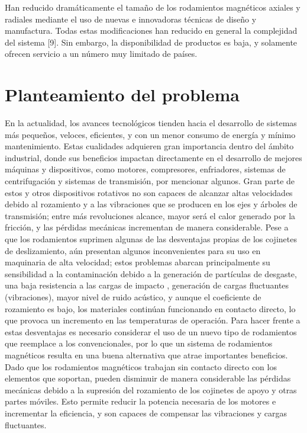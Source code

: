 Han reducido dramáticamente el tamaño de los rodamientos magnéticos axiales y radiales mediante el uso de nuevas e innovadoras técnicas de diseño y manufactura. Todas estas modificaciones han reducido en general la complejidad del sistema [9].
Sin embargo, la disponibilidad de productos es baja, y solamente ofrecen servicio a un número muy limitado de países.

\section*{Planteamiento del problema}
\label{sec:intro:results}

En la actualidad, los avances tecnológicos tienden hacia el desarrollo de sistemas más pequeños, veloces, eficientes, y con un menor consumo de energía y mínimo mantenimiento. Estas cualidades adquieren gran importancia dentro del ámbito industrial, donde sus beneficios impactan directamente en el desarrollo de mejores máquinas y dispositivos, como motores, compresores, enfriadores, sistemas de centrifugación y sistemas de transmisión, por mencionar algunos.
Gran parte de estos y otros dispositivos rotativos no son capaces de alcanzar altas velocidades debido al rozamiento y a las vibraciones que se producen en los ejes y árboles de transmisión; entre más revoluciones alcance, mayor será el calor generado por la fricción, y las pérdidas mecánicas incrementan de manera considerable. 
Pese a que los rodamientos suprimen algunas de las desventajas propias de los cojinetes de deslizamiento, aún presentan algunos inconvenientes para su uso en maquinaria de alta velocidad; estos problemas abarcan principalmente su sensibilidad a la contaminación debido a la generación de partículas de desgaste, una baja resistencia a las cargas de impacto , generación de cargas fluctuantes  (vibraciones), mayor nivel de ruido acústico, y aunque el coeficiente de rozamiento es bajo, los materiales continúan funcionando en contacto directo, lo que provoca un incremento en las temperaturas de operación. 
Para hacer frente a estas desventajas es necesario considerar el uso de un nuevo tipo de rodamientos que reemplace a los convencionales, por lo que un sistema de rodamientos magnéticos resulta en una buena alternativa que atrae importantes beneficios. 
Dado que los rodamientos magnéticos trabajan sin contacto directo con los elementos que soportan, pueden disminuir de manera considerable las pérdidas mecánicas debido a la supresión del rozamiento de los cojinetes de apoyo y otras partes móviles. Esto permite reducir la potencia necesaria de los motores e incrementar la eficiencia, y son capaces de compensar las vibraciones y cargas fluctuantes. 
